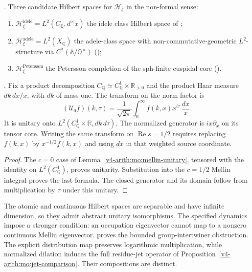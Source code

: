 \begin{definition}
\label{v4-arith:w9-r4:def:target-completion}
\ClaimStatusDefinitional. Three candidate Hilbert spaces for
\(\mathcal{H}_{\xi}\) in the non-formal sense:
\begin{enumerate}
\item \(\mathcal{H}_{\xi}^{\mathrm{idele}}=L^{2}(C_{\mathbb{Q}},d^{\times}x)\)
the idele class Hilbert space of
;
\item \(\mathcal{H}_{\xi}^{\mathrm{adele}}=L^{2}(X_{\mathbb{Q}})\) the
adele-class space with non-commutative-geometric \(L^{2}\)-structure
via \(C^{*}(\mathbb{A}/\mathbb{Q}^{\times})\)
();
\item \(\mathcal{H}_{\xi}^{\mathrm{Petersson}}\) the Petersson
completion of the sph-finite cuspidal core
().
\end{enumerate}
\end{definition}

\begin{lemma}
\label{v4-arith:w9-r4:lem:mellin-on-idele}
\ClaimStatusProvedHereConditional. Fix a product decomposition
$C_{\mathbb Q}\simeq C_{\mathbb Q}^1\times\mathbb R_{>0}$
and the product Haar measure $dk\,dx/x$, with $dk$ of mass one.
The transform on the norm factor is
\[
 (\mathcal U_0f)(k,\tau)=\frac1{\sqrt{2\pi}}
             \int_0^\infty f(k,x)x^{i\tau}\,\frac{dx}{x}.
\]
It is unitary onto $L^2(C_{\mathbb Q}^1\times\mathbb R,dk\,d\tau)$.
The normalized generator is $i x\partial_x$ on its tensor core.
Writing the same transform on $\operatorname{Re}s=1/2$ requires
replacing $f(k,x)$ by $x^{-1/2}f(k,x)$ and using $dx$ in that
weighted source coordinate.
\end{lemma}
\begin{proof}
The $c=0$ case of Lemma~\ref{v4-arith:mo:mellin-unitary}, tensored
with the identity on $L^2(C_{\mathbb Q}^1)$, proves unitarity.
Substitution into the $c=1/2$ Mellin integral proves the last formula.
The closed generator and its domain follow from multiplication
by $\tau$ under this unitary.
\end{proof}

\begin{remark}
\label{v4-arith:w9-r4:rem:completion-mismatch}
The atomic and continuous Hilbert spaces are separable and have
infinite dimension, so they admit abstract unitary isomorphisms.
The specified dynamics impose a stronger condition: an occupation
eigenvector cannot map to a nonzero continuous Mellin eigenvector.
 proves
the bounded group-intertwiner obstruction. The explicit distribution
map preserves logarithmic multiplication, while normalized dilation
induces the full residue-jet operator of
Proposition~\ref{v4-arith:mo:jet-comparison}. Their compositions are distinct.
\end{remark}

